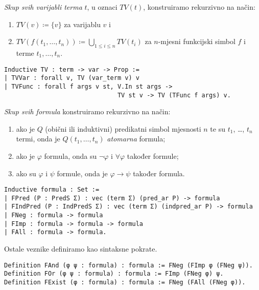 \pagebreak
\begin{definition}
  \textit{Skup svih varijabli terma} \(t\), u oznaci \(\mathit{TV}(t)\), konstruiramo rekurzivno na način:
  \begin{enumerate}
  \item \( \mathit{TV}(v) \coloneq \{ v \} \) za varijablu \(v\) i
  \item \( \mathit{TV}(f(t_{1}, \ldots, t_{n})) \coloneq \bigcup_{1 \le i \le n} \mathit{TV}(t_{i}) \) za \(n\)-mjesni funkcijski simbol \(f\) i terme \(t_{1}, \ldots, t_{n}\).
  \end{enumerate}
\begin{verbatim}
Inductive TV : term -> var -> Prop :=
| TVVar : forall v, TV (var_term v) v
| TVFunc : forall f args v st, V.In st args ->
                               TV st v -> TV (TFunc f args) v.
\end{verbatim}
\end{definition}

\begin{definition}\label{def:formula}
  \textit{Skup svih formula} konstruiramo rekurzivno na način:
  \begin{enumerate}
  \item ako je \(Q\) (obični ili induktivni) predikatni simbol mjesnosti \(n\) te su \(t_{1}\), \ldots, \(t_{n}\) termi,
    onda je \(Q(t_{1}, \ldots, t_{n})\) \textit{atomarna} formula;
  \item ako je \(\varphi\) formula, onda su \(\neg\varphi\) i \(\forall\varphi\) također formule;
  \item ako su \(\varphi\) i \(\psi\) formule, onda je \(\varphi \rightarrow \psi\) također formula.
  \end{enumerate}
\begin{verbatim}
Inductive formula : Set :=
| FPred (P : PredS Σ) : vec (term Σ) (pred_ar P) -> formula 
| FIndPred (P : IndPredS Σ) : vec (term Σ) (indpred_ar P) -> formula 
| FNeg : formula -> formula 
| FImp : formula -> formula -> formula 
| FAll : formula -> formula.
\end{verbatim}
  \noindent Ostale veznike definiramo kao sintaksne pokrate.
\begin{verbatim}
Definition FAnd (φ ψ : formula) : formula := FNeg (FImp φ (FNeg ψ)).
Definition FOr (φ ψ : formula) : formula := FImp (FNeg φ) ψ.
Definition FExist (φ : formula) : formula := FNeg (FAll (FNeg φ)).
\end{verbatim}
\end{definition}



